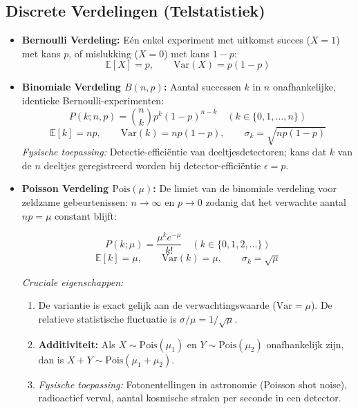\documentclass[11pt,a4paper]{article}
\newcommand{\E}{\mathbb{E}}
\newcommand{\Var}{\text{Var}}
\begin{document}
\subsection{Discrete Verdelingen (Telstatistiek)}
\begin{itemize}[leftmargin=1.5em]
    \item \textbf{Bernoulli Verdeling:} Eén enkel experiment met uitkomst succes ($X = 1$) met kans $p$, of mislukking ($X = 0$) met kans $1 - p$:
    \begin{equation}
        \E[X] = p, \qquad \Var(X) = p(1 - p)
    \end{equation}
    \item \textbf{Binomiale Verdeling $B(n, p)$:}
    Aantal successen $k$ in $n$ onafhankelijke, identieke Bernoulli-experimenten:
    \begin{equation}
        P(k; n, p) = \binom{n}{k} p^k (1 - p)^{n - k} \quad (k \in \{0, 1, \ldots, n\})
    \end{equation}
    \begin{equation}
        \E[k] = np, \qquad \Var(k) = np(1 - p), \qquad \sigma_k = \sqrt{np(1 - p)}
    \end{equation}
    \emph{Fysische toepassing:} Detectie-efficiëntie van deeltjesdetectoren; kans dat $k$ van de $n$ deeltjes geregistreerd worden bij detector-efficiëntie $\epsilon = p$.
    \item \textbf{Poisson Verdeling $\text{Pois}(\mu)$:}
    De limiet van de binomiale verdeling voor zeldzame gebeurtenissen: $n \to \infty$ en $p \to 0$ zodanig dat het verwachte aantal $np = \mu$ constant blijft:
    \begin{formulabox}
    \begin{equation}
        P(k; \mu) = \frac{\mu^k e^{-\mu}}{k!} \quad (k \in \{0, 1, 2, \ldots\})
    \end{equation}
    \begin{equation}
        \E[k] = \mu, \qquad \Var(k) = \mu, \qquad \sigma_k = \sqrt{\mu}
    \end{equation}
    \end{formulabox}
    \emph{Cruciale eigenschappen:}
    \begin{enumerate}
        \item De variantie is exact gelijk aan de verwachtingswaarde ($\Var = \mu$). De relatieve statistische fluctuatie is $\sigma/\mu = 1/\sqrt{\mu}$.
        \item \textbf{Additiviteit:} Als $X \sim \text{Pois}(\mu_1)$ en $Y \sim \text{Pois}(\mu_2)$ onafhankelijk zijn, dan is $X + Y \sim \text{Pois}(\mu_1 + \mu_2)$.
        \item \emph{Fysische toepassing:} Fotonentellingen in astronomie (Poisson shot noise), radioactief verval, aantal kosmische stralen per seconde in een detector.
    \end{enumerate}
\end{itemize}
\end{document}
